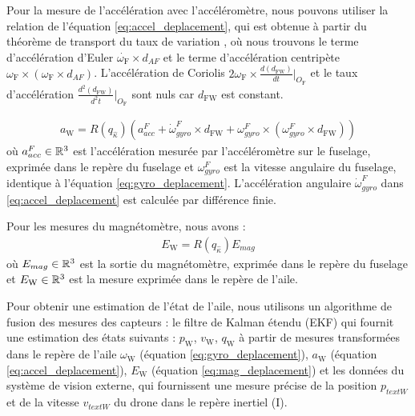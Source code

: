 Pour la mesure de l'accélération avec l'accéléromètre, nous pouvons utiliser la relation de l'équation \eqref{eq:accel_deplacement}, qui est obtenue à partir du théorème de transport du taux de variation \cite{brizard2004motion}, où nous trouvons le terme d'accélération d'Euler $\dot{\omega_{\text{F}}} \times d_{AF}$  et le terme d'accélération centripète $\omega_{\text{F}} \times ( \omega_{\text{F}} \times  d_{AF})$. L'accélération de Coriolis $2\omega_{\text{F}} \times \frac{d (d_{\text{FW}})}{d t}\Bigr|_{O_{\text{F}}}$ et le taux d'accélération $\frac{d^{2} (d_{\text{FW}})}{d^{2} t}\Bigr|_{O_{\text{F}}}$ sont nuls car $d_{\text{FW}}$ est constant.

\begin{align}
    \label{eq:accel_deplacement}
    a_{\text{W}} = R(q_{\hat{\kappa}}) \left( a_{acc}^{F} + \dot{\omega}_{gyro}^{F} \times d_{\text{FW}} + \omega_{gyro}^{F} \times ( \omega_{gyro}^{F} \times  d_{\text{FW}}) \right) 
\end{align}
où $a_{acc}^{F} \in {\mathbb R}^{3}$ est l'accélération mesurée par l'accéléromètre sur le fuselage, exprimée dans le repère du fuselage et $\omega_{gyro}^{F}$ est la vitesse angulaire du fuselage, identique à l'équation \eqref{eq:gyro_deplacement}. L'accélération angulaire $\dot{\omega}_{gyro}^{F}$ dans \eqref{eq:accel_deplacement} est calculée par différence finie.


Pour les mesures du magnétomètre, nous avons :
\begin{align}
    \label{eq:mag_deplacement}
    E_{\text{W}} = R(q_{\hat{\kappa}}) E_{mag}
\end{align}
où $E_{mag} \in {\mathbb R}^{3}$ est la sortie du magnétomètre, exprimée dans le repère du fuselage et $ E_{\text{W}} \in {\mathbb R}^{3}$ est la mesure exprimée dans le repère de l'aile.

Pour obtenir une estimation de l'état de l'aile, nous utilisons un algorithme de fusion des mesures des capteurs : le filtre de Kalman étendu (EKF)   qui fournit une estimation des états suivants : $p_{\text{W}}$, $v_{\text{W}}$, $q_{\text{W}}$ à partir de mesures transformées dans le repère de l'aile $\omega_{\text{W}}$ (équation \eqref{eq:gyro_deplacement}), $a_{\text{W}}$ (équation \eqref{eq:accel_deplacement}), $E_{\text{W}}$ (équation \eqref{eq:mag_deplacement}) et les données du système de vision externe, qui fournissent une mesure précise de la position $p_{text{W}}$ et de la vitesse $v_{text{W}}$ du drone dans le repère inertiel (I).



